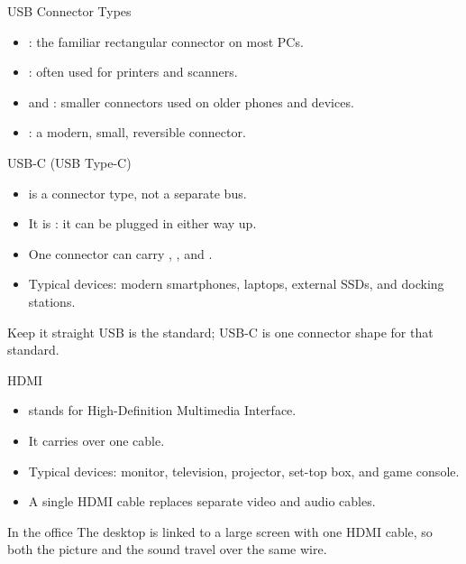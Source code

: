 \documentclass[aspectratio=169]{beamer}
\begin{document}
\begin{frame}{USB Connector Types}
  \begin{itemize}
    \item {}: the familiar rectangular connector on most PCs.
    \item {}: often used for printers and scanners.
    \item {} and : smaller connectors used on older
      phones and devices.
    \item {}: a modern, small, reversible connector.
  \end{itemize}
  \vspace{0.25cm}
\end{frame}

\begin{frame}{USB-C (USB Type-C)}
  \begin{itemize}
    \item {} is a connector type, not a separate bus.
    \item It is : it can be plugged in either way up.
    \item One connector can carry , , and .
    \item Typical devices: modern smartphones, laptops, external SSDs, and
      docking stations.
  \end{itemize}
  \begin{block}{Keep it straight}
    USB is the standard; USB-C is one connector shape for that standard.
  \end{block}
\end{frame}

\begin{frame}{HDMI}
  \begin{itemize}
    \item {} stands for High-Definition Multimedia Interface.
    \item It carries  over one cable.
    \item Typical devices: monitor, television, projector, set-top box, and
      game console.
    \item A single HDMI cable replaces separate video and audio cables.
  \end{itemize}
  \begin{exampleblock}{In the office}
    The desktop is linked to a large screen with one HDMI cable, so both the
    picture and the sound travel over the same wire.
  \end{exampleblock}
\end{frame}
\end{document}
